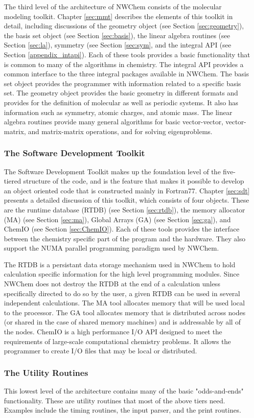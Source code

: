 The third level of the architecture of NWChem consists of
the molecular modeling toolkit.  Chapter \ref{sec:mmt} describes the
elements of this toolkit in detail,  including discussions of 
the geometry object (see Section \ref{sec:geometry}), 
the basis set object (see Section \ref{sec:basis}), the
linear algebra routines (see Section \ref{sec:la}), 
symmetry (see Section \ref{sec:sym}, and
the integral API (see Section
\ref{appendix_intapi}).  Each of these 
tools provides a basic functionality that is common to many of the
algorithms in chemistry.  The integral API provides a common interface to
the three integral packages available in NWChem.  The basis set object
provides the programmer with information related to a specific basis
set.  The geometry object provides the basic geometry in different
formats and provides for the definition of molecular as well as periodic
systems.  It also has information such as symmetry, atomic charges, and
atomic mass.  The linear algebra routines provide many general 
algorithms for basic vector-vector, vector-matrix, and matrix-matrix
operations, and for solving
eigenproblems.

\subsubsection{The Software Development Toolkit}

The Software Development Toolkit
makes up the foundation level of the five-tiered
structure of the code, and is the feature that makes it possible
to develop an object oriented code that is constructed mainly
in Fortran77.  Chapter \ref{sec:sdt} presents a detailed discussion
of this toolkit, which consists of four objects.
These are the runtime database (RTDB) (see Section
\ref{sec:rtdb}), the memory allocator (MA) (see Section \ref{sec:ma}),
Global Arrays (GA) (see Section \ref{sec:ga}), and ChemIO 
(see Section \ref{sec:ChemIO}).  Each of these tools provides the
interface between the chemistry specific part of the program and the
hardware.  They also support the NUMA parallel programming
paradigm used by NWChem.

The RTDB is a persistant data storage mechanism used in NWChem
to hold calculation specific information for the high level
programming modules.  Since NWChem does not destroy the RTDB at the end of
a calculation unless specifically directed to do so by the user, 
a given RTDB can be used in several independent
calculations.  The MA tool allocates memory that will be used local to
the processor.  The GA tool allocates memory that is distributed across
nodes (or shared in the case of shared memory machines) and is addressable
by all of the nodes.  ChemIO is a high performance I/O API 
designed to meet the requirements of large-scale computational
chemistry problems.  It allows the programmer to 
create I/O files that may be local or distributed.

\subsubsection{The Utility Routines}

This lowest level of the architecture contains many of the basic 
"odds-and-ends" functionality.
These are utility routines that most of the
above tiers need.
Examples include the timing routines,
the input parser, 
and the print routines.

